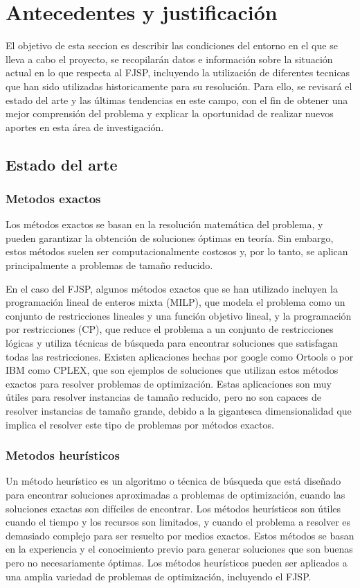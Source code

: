\section{Antecedentes y justificación}
El objetivo de esta seccion es describir las condiciones del entorno en el que se lleva a cabo 
el proyecto, se recopilarán datos e información sobre la situación actual en lo que respecta al FJSP, 
incluyendo la utilización de diferentes tecnicas que han sido utilizadas historicamente para su resolución. 
Para ello, se revisará el estado del arte y las últimas tendencias en este campo, con el fin de obtener una 
mejor comprensión del problema y explicar la oportunidad de realizar nuevos aportes en esta área de investigación.


\subsection{Estado del arte}
\subsubsection{Metodos exactos}
Los métodos exactos se basan en la resolución matemática del problema, y pueden garantizar la 
obtención de soluciones óptimas en teoría. Sin embargo, estos métodos suelen ser computacionalmente 
costosos y, por lo tanto, se aplican principalmente a problemas de tamaño reducido.\medskip

En el caso del FJSP, algunos métodos exactos que se han utilizado incluyen la programación 
lineal de enteros mixta (MILP)\cite{milp}, que modela el problema como un conjunto de restricciones lineales y 
una función objetivo lineal, y la programación por restricciones (CP)\cite{wikiCP}, que reduce el problema a
un conjunto de restricciones lógicas y utiliza técnicas de búsqueda para encontrar soluciones que satisfagan 
todas las restricciones. Existen aplicaciones hechas por google como Ortools\cite{ortools}
o por IBM como CPLEX\cite{cplex}, que son ejemplos de soluciones que utilizan estos métodos exactos para resolver
problemas de optimización. Estas aplicaciones son muy útiles para resolver instancias de tamaño reducido,
pero no son capaces de resolver instancias de tamaño grande, debido a la gigantesca dimensionalidad que
implica el resolver este tipo de problemas por métodos exactos.


\subsubsection{Metodos heurísticos}
Un método heurístico es un algoritmo o técnica de búsqueda que está diseñado para encontrar 
soluciones aproximadas a problemas de optimización, cuando las soluciones exactas son difíciles 
de encontrar. Los métodos heurísticos son útiles cuando el tiempo y los recursos son limitados, 
y cuando el problema a resolver es demasiado complejo para ser resuelto por medios exactos. 
Estos métodos se basan en la experiencia y el conocimiento previo para generar soluciones que 
son buenas pero no necesariamente óptimas. Los métodos heurísticos pueden ser aplicados a una 
amplia variedad de problemas de optimización, incluyendo el FJSP.\medskip

